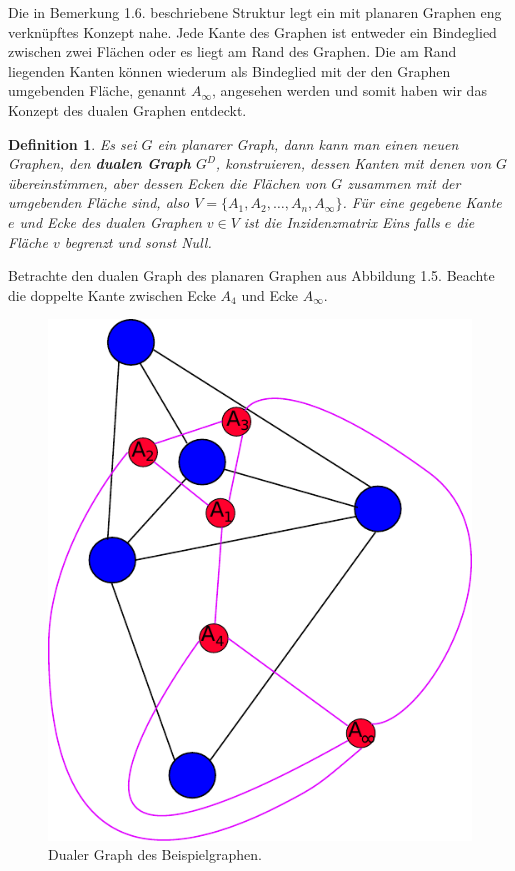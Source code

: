 \documentclass[11pt,a4paper,leqno]{report}
\newtheorem{definition}[theorem]{Definition}
\numberwithin{equation}{chapter}
\begin{document}
\noindent
Die in Bemerkung 1.6. beschriebene Struktur legt ein mit planaren Graphen eng verkn\"upftes Konzept nahe. Jede Kante des Graphen ist entweder ein Bindeglied zwischen zwei Fl\"achen oder es liegt am Rand des Graphen. Die am Rand liegenden Kanten k\"onnen wiederum als Bindeglied mit der den Graphen umgebenden Fl\"ache, genannt $A_{\infty}$, angesehen werden und somit haben wir das Konzept des dualen Graphen entdeckt.
\begin{definition}
	Es sei $G$ ein planarer Graph, dann kann man einen neuen Graphen, den \textbf{dualen Graph} $G^D$, konstruieren, dessen Kanten mit denen von $G$ \"ubereinstimmen, aber dessen Ecken die Fl\"achen von $G$ zusammen mit der umgebenden Fl\"ache sind, also $V=\{A_1, A_2, \dots, A_n, A_\infty \}$. F\"ur eine gegebene Kante $e$ und Ecke des dualen Graphen $v\in V$ ist die Inzidenzmatrix Eins falls $e$ die Fl\"ache $v$ begrenzt und sonst Null.
\end{definition}
\noindent
Betrachte den dualen Graph des planaren Graphen aus Abbildung 1.5. Beachte die doppelte Kante zwischen Ecke $A_4$ und Ecke $A_\infty$. 
\begin{figure}[H]
	\begin{center}
		\includegraphics[scale=0.4]{Abbildungen/graph_1_dual.pdf}
		\caption{Dualer Graph des Beispielgraphen.}
	\end{center}
\end{figure}
\end{document}
